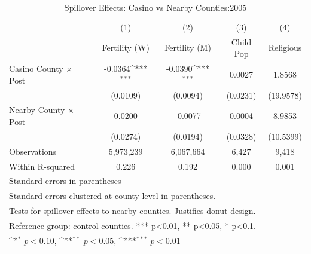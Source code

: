 \begin{table}[htbp]\centering
\def\sym#1{\ifmmode^{#1}\else\(^{#1}\)\fi}
\caption{Spillover Effects: Casino vs Nearby Counties:2005}
\begin{tabular}{l*{4}{c}}
\hline\hline
            &\multicolumn{1}{c}{(1)}&\multicolumn{1}{c}{(2)}&\multicolumn{1}{c}{(3)}&\multicolumn{1}{c}{(4)}\\
            &\multicolumn{1}{c}{Fertility (W)}&\multicolumn{1}{c}{Fertility (M)}&\multicolumn{1}{c}{Child Pop}&\multicolumn{1}{c}{Religious}\\
\hline
Casino County × Post&     -0.0364\sym{***}&     -0.0390\sym{***}&      0.0027         &      1.8568         \\
            &    (0.0109)         &    (0.0094)         &    (0.0231)         &   (19.9578)         \\
[1em]
Nearby County × Post&      0.0200         &     -0.0077         &      0.0004         &      8.9853         \\
            &    (0.0274)         &    (0.0194)         &    (0.0328)         &   (10.5399)         \\
\hline
Observations&   5,973,239         &   6,067,664         &       6,427         &       9,418         \\
Within R-squared&       0.226         &       0.192         &       0.000         &       0.001         \\
\hline\hline
\multicolumn{5}{l}{\footnotesize Standard errors in parentheses}\\
\multicolumn{5}{l}{\footnotesize Standard errors clustered at county level in parentheses.}\\
\multicolumn{5}{l}{\footnotesize Tests for spillover effects to nearby counties. Justifies donut design.}\\
\multicolumn{5}{l}{\footnotesize Reference group: control counties. *** p<0.01, ** p<0.05, * p<0.1.}\\
\multicolumn{5}{l}{\footnotesize \sym{*} \(p<0.10\), \sym{**} \(p<0.05\), \sym{***} \(p<0.01\)}\\
\end{tabular}
\end{table}
